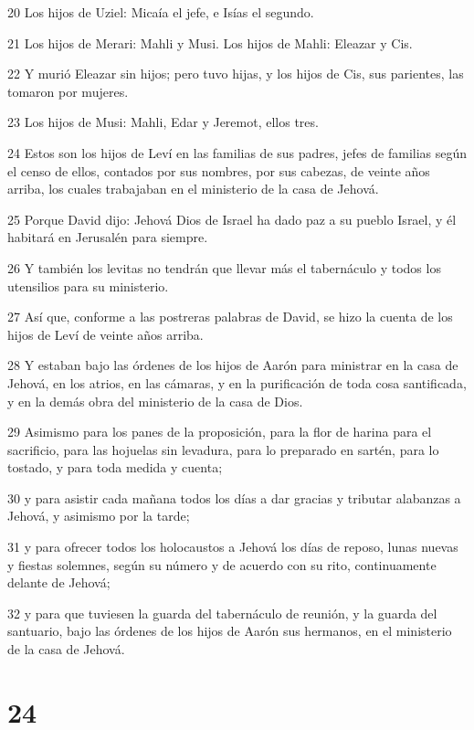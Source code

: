 \par 20 Los hijos de Uziel: Micaía el jefe, e Isías el segundo.
\par 21 Los hijos de Merari: Mahli y Musi. Los hijos de Mahli: Eleazar y Cis.
\par 22 Y murió Eleazar sin hijos; pero tuvo hijas, y los hijos de Cis, sus parientes, las tomaron por mujeres.
\par 23 Los hijos de Musi: Mahli, Edar y Jeremot, ellos tres.
\par 24 Estos son los hijos de Leví en las familias de sus padres, jefes de familias según el censo de ellos, contados por sus nombres, por sus cabezas, de veinte años arriba, los cuales trabajaban en el ministerio de la casa de Jehová.
\par 25 Porque David dijo: Jehová Dios de Israel ha dado paz a su pueblo Israel, y él habitará en Jerusalén para siempre.
\par 26 Y también los levitas no tendrán que llevar más el tabernáculo y todos los utensilios para su ministerio. 
\par 27 Así que, conforme a las postreras palabras de David, se hizo la cuenta de los hijos de Leví de veinte años arriba.
\par 28 Y estaban bajo las órdenes de los hijos de Aarón para ministrar en la casa de Jehová, en los atrios, en las cámaras, y en la purificación de toda cosa santificada, y en la demás obra del ministerio de la casa de Dios.
\par 29 Asimismo para los panes de la proposición, para la flor de harina para el sacrificio, para las hojuelas sin levadura, para lo preparado en sartén, para lo tostado, y para toda medida y cuenta;
\par 30 y para asistir cada mañana todos los días a dar gracias y tributar alabanzas a Jehová, y asimismo por la tarde;
\par 31 y para ofrecer todos los holocaustos a Jehová los días de reposo, lunas nuevas y fiestas solemnes, según su número y de acuerdo con su rito, continuamente delante de Jehová;
\par 32 y para que tuviesen la guarda del tabernáculo de reunión, y la guarda del santuario, bajo las órdenes de los hijos de Aarón sus hermanos, en el ministerio de la casa de Jehová. 

\chapter{24}

